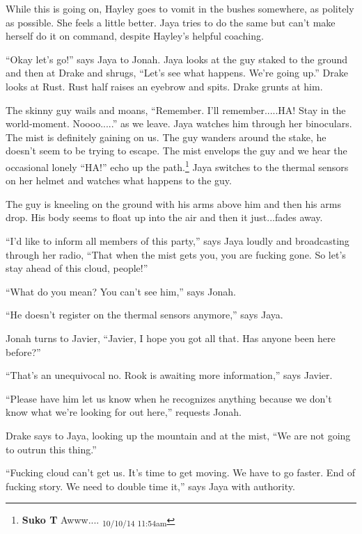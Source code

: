 While this is going on, Hayley goes to vomit in the bushes somewhere, as politely as possible.  She feels a little better.  Jaya tries to do the same but can't make herself do it on command, despite Hayley's helpful coaching.

``Okay let's go!'' says Jaya to Jonah.  Jaya looks at the guy staked to the ground and then at Drake and shrugs, ``Let's see what happens. We're going up.''  Drake looks at Rust.  Rust half raises an eyebrow and spits.  Drake grunts at him.



The skinny guy wails and moans, ``Remember.  I'll remember.....HA!  Stay in the world-moment.  Noooo.....'' as we leave.  Jaya watches him through her binoculars.  The mist is definitely gaining on us.  The guy wanders around the stake, he doesn't seem to be trying to escape.  The mist envelops the guy and we hear the occasional lonely ``HA!'' echo up the path.\footnote{\textbf{Suko T }Awww.... \textsubscript{10/10/14 11:54am}}  Jaya switches to the thermal sensors on her helmet and watches what happens to the guy.

The guy is kneeling on the ground with his arms above him and then his arms drop.  His body seems to float up into the air and then it just...fades away.

``I'd like to inform all members of this party,'' says Jaya loudly and broadcasting through her radio, ``That when the mist gets you, you are fucking gone.  So let's stay ahead of this cloud, people!''

``What do you mean?  You can't see him,'' says Jonah.

``He doesn't register on the thermal sensors anymore,'' says Jaya.

Jonah turns to Javier, ``Javier, I hope you got all that.  Has anyone been here before?''

``That's an unequivocal no.  Rook is awaiting more information,'' says Javier.

``Please have him let us know when he recognizes anything because we don't know what we're looking for out here,'' requests Jonah.

Drake says to Jaya, looking up the mountain and at the mist, ``We are not going to outrun this thing.''

``Fucking cloud can't get us. It's time to get moving.  We have to go faster.  End of fucking story.  We need to double time it,'' says Jaya with authority.



